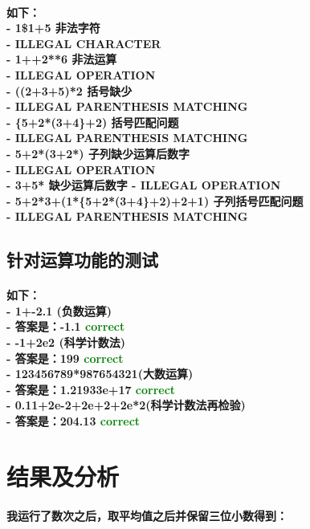 \documentclass[UTF8]{ctexart}
\begin{document}
\paragraph{
如下：\\
- 1\$1+5  非法字符\\
- ILLEGAL CHARACTER \\
- 1++2**6 非法运算\\
- ILLEGAL OPERATION \\
- ((2+3+5)*2 括号缺少\\
- ILLEGAL PARENTHESIS MATCHING \\
- \{5+2*(3+4\}+2) 括号匹配问题\\
- ILLEGAL PARENTHESIS MATCHING \\
- 5+2*(3+2*) 子列缺少运算后数字\\
- ILLEGAL OPERATION \\
- 3+5* 缺少运算后数字
- ILLEGAL OPERATION\\
- 5+2*3+(1*\{5+2*(3+4\}+2)+2+1) 子列括号匹配问题\\
- ILLEGAL PARENTHESIS MATCHING
}
\subsection{针对运算功能的测试}
\paragraph{
如下：\\
- 1+-2.1 (负数运算)\\
- 答案是：-1.1 \textcolor{green}{correct}\\
- -1+2e2 (科学计数法)\\
- 答案是：199 \textcolor{green}{correct}\\
- 123456789*987654321(大数运算)\\
- 答案是：1.21933e+17 \textcolor{green}{correct}\\
- 0.11+2e-2+2e+2+2e*2(科学计数法再检验)\\
- 答案是：204.13 \textcolor{green}{correct}\\
}
\section{结果及分析}
\paragraph{\hspace{2em}我运行了数次之后，取平均值之后并保留三位小数得到：\newline
}
\end{document}

